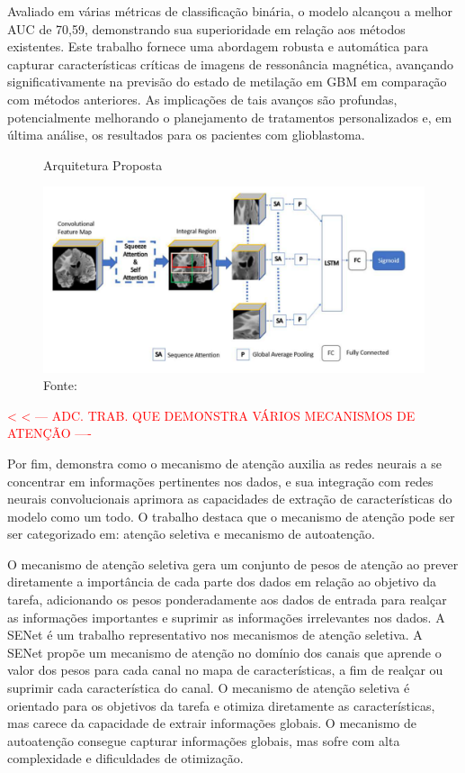 Avaliado em várias métricas de classificação binária, o modelo alcançou a melhor \gls{AUC} de 70,59, demonstrando sua superioridade em relação aos métodos existentes. Este trabalho fornece uma abordagem robusta e automática para capturar características críticas de imagens de ressonância magnética, avançando significativamente na previsão do estado de metilação em \gls{GBM} em comparação com métodos anteriores. As implicações de tais avanços são profundas, potencialmente melhorando o planejamento de tratamentos personalizados e, em última análise, os resultados para os pacientes com glioblastoma.

\begin{figure}[htbp]
    \centering
    \caption{Arquitetura Proposta}
    \includegraphics[width=1\textwidth]{figures/fig010.png}
    \caption*{Fonte: \cite{iranmehrImprovedPredictionMGMT2022}}
    \label{fig:fig010}
\end{figure}

\noindent \textcolor{red}{
< < --- ADC. TRAB. QUE DEMONSTRA VÁRIOS MECANISMOS DE ATENÇÃO ----
}

Por fim,  demonstra como o mecanismo de atenção auxilia as redes neurais a se concentrar em informações pertinentes nos dados, e sua integração com redes neurais convolucionais aprimora as capacidades de extração de características do modelo como um todo. O trabalho destaca que o mecanismo de atenção pode ser ser categorizado em: atenção seletiva e mecanismo de autoatenção.

O mecanismo de atenção seletiva gera um conjunto de pesos de atenção ao prever diretamente a importância de cada parte dos dados em relação ao objetivo da tarefa, adicionando os pesos ponderadamente aos dados de entrada para realçar as informações importantes e suprimir as informações irrelevantes nos dados. A \gls{SE}Net é um trabalho representativo nos mecanismos de atenção seletiva. A \gls{SE}Net propõe um mecanismo de atenção no domínio dos canais que aprende o valor dos pesos para cada canal no mapa de características, a fim de realçar ou suprimir cada característica do canal. O mecanismo de atenção seletiva é orientado para os objetivos da tarefa e otimiza diretamente as características, mas carece da capacidade de extrair informações globais. O mecanismo de autoatenção consegue capturar informações globais, mas sofre com alta complexidade e dificuldades de otimização. 

